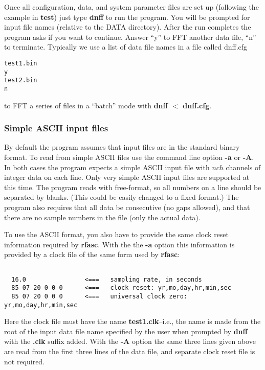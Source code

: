Once all configuration, data, and system parameter
files are set up (following the example in {\bf test})
just type {\bf dnff} to run the program.  You will be prompted
for input file names (relative to the DATA directory).
After the run completes the program asks if you want to continue.
Answer ``y'' to FFT another data file, ``n'' to terminate.
Typically we use a list of data file names in a file called dnff.cfg
\small
\begin{verbatim}
test1.bin
y
test2.bin
n
\end{verbatim}
\normalsize
to FFT a series of files in a ``batch'' mode with {\bf dnff $<$ dnff.cfg}.

\subsubsection{Simple ASCII input files}

By default the program assumes that input files are in the standard
binary format.  To read from simple ASCII files use the command
line option {\bf -a} or {\bf -A}.  In both cases the
program expects a simple ASCII input file with $nch$ channels of
integer data on each line.  
Only very simple ASCII input files are supported at this time.
The program reads with free-format,
so all numbers on a line should be separated by blanks. 
(This could be easily changed to a fixed format.)  
The program also requires that all data be consecutive
(no gaps allowed), and that there are no sample numbers
in the file (only the actual data).

To use the ASCII
format, you also have to provide the same clock reset information
required by {\bf rfasc}.  With the the {\bf -a}
option this information is provided by a clock file of 
the same form used by {\bf rfasc}:

\small
\begin{verbatim}

  16.0                <===   sampling rate, in seconds
  85 07 20 0 0 0      <===   clock reset: yr,mo,day,hr,min,sec
  85 07 20 0 0 0      <===   universal clock zero: yr,mo,day,hr,min,sec
\end{verbatim}
\normalsize

Here the clock file must have the name {\bf test1.clk}--i.e.,
the name is made
from the root of the input data file name specified by the user
when prompted by {\bf dnff} with the {\bf .clk}
suffix added.  With the {\bf -A} option
the same three lines given above are read from the first three lines of
the data file, and separate clock reset file is not required.

